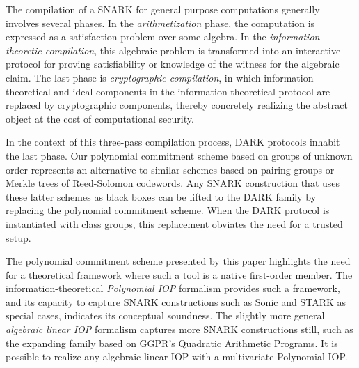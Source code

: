 
The compilation of a SNARK for general purpose computations generally involves several phases. In the \emph{arithmetization} phase, the computation is expressed as a satisfaction problem over some algebra. In the \emph{information-theoretic compilation}, this algebraic problem is transformed into an interactive protocol for proving satisfiability or knowledge of the witness for the algebraic claim. The last phase is \emph{cryptographic compilation}, in which information-theoretical and ideal components in the information-theoretical protocol are replaced by cryptographic components, thereby concretely realizing the abstract object at the cost of computational security. 

In the context of this three-pass compilation process, DARK protocols inhabit the last phase. Our polynomial commitment scheme based on groups of unknown order represents an alternative to similar schemes based on pairing groups or Merkle trees of Reed-Solomon codewords. Any SNARK construction that uses these latter schemes as black boxes can be lifted to the DARK family by replacing the polynomial commitment scheme. When the DARK protocol is instantiated with class groups, this replacement obviates the need for a trusted setup.

The polynomial commitment scheme presented by this paper highlights the need for a theoretical framework where such a tool is a native first-order member.  The information-theoretical \emph{Polynomial IOP} formalism provides such a framework, and its capacity to capture SNARK constructions such as \textsf{Sonic} and \textsf{STARK} as special cases, indicates its conceptual soundness. The slightly more general \emph{algebraic linear IOP} formalism captures more SNARK constructions still, such as the expanding family based on GGPR's Quadratic Arithmetic Programs. It is possible to realize any algebraic linear IOP with a multivariate Polynomial IOP.

